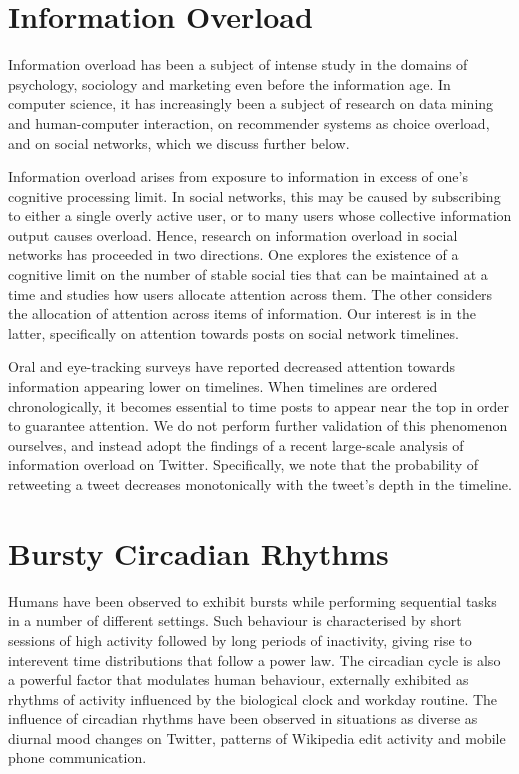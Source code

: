 \documentclass[onesided,asymmetric]{tufte-book}
\begin{document}
\newpage
\section{Information Overload}

Information overload has been a subject of intense study in the domains of psychology, sociology and marketing even before the information age\cite{eppler2004concept}. In computer science, it has increasingly been a subject of research on data mining and human-computer interaction\cite{Shahaf:2010:CDN:1835804.1835884}, on recommender systems as choice overload\cite{Bollen:2010:UCO:1864708.1864724}, and on social networks, which we discuss further below.

Information overload arises from exposure to information in excess of one's cognitive processing limit. In social networks, this may be caused by subscribing to either a single overly active user, or to many users whose collective information output causes overload. Hence, research on information overload in social networks has proceeded in two directions. One explores the existence of a cognitive limit on the number of stable social ties that can be maintained at a time and studies how users allocate attention across them\cite{backstrom2011center}\cite{gonccalves2011modeling}. The other considers the allocation of attention across items of information. Our interest is in the latter, specifically on attention towards posts on social network timelines.

Oral and eye-tracking surveys\cite{counts2011taking} have reported decreased attention towards information appearing lower on timelines. When timelines are ordered chronologically, it becomes essential to time posts to appear near the top in order to guarantee attention. We do not perform further validation of this phenomenon ourselves, and instead adopt the findings of a recent large-scale analysis of information overload on Twitter\cite{gomez2014quantifying}. Specifically, we note that the  probability of retweeting a tweet decreases monotonically with the tweet's depth in the timeline.

\section{Bursty Circadian Rhythms}
\label{ch:bursty-circadian}

Humans have been observed to exhibit bursts while performing sequential tasks in a number of different settings. Such behaviour is characterised by short sessions of high activity followed by long periods of inactivity, giving rise to interevent time distributions that follow a power law. The circadian cycle is also a powerful factor that modulates human behaviour, externally exhibited as rhythms of activity influenced by the biological clock and workday routine. The influence of circadian rhythms have been observed in situations as diverse as diurnal mood changes on Twitter\cite{golder2011diurnal}, patterns of Wikipedia edit activity\cite{yasseri2012circadian} and mobile phone communication\cite{jo2012circadian}.
\end{document}
